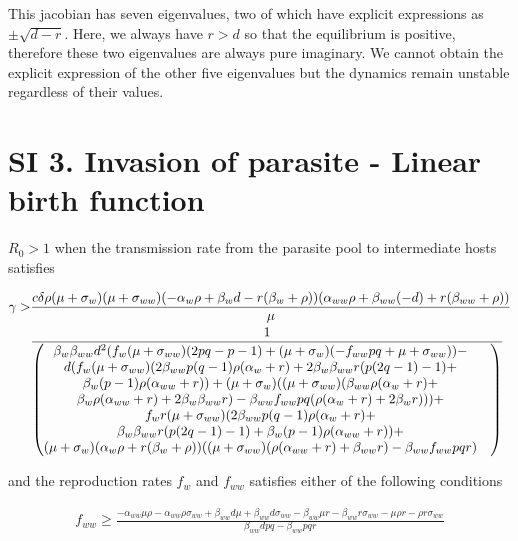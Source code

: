 \documentclass[11pt]{article}
\begin{document}
This jacobian has seven eigenvalues, two of which have explicit expressions as $\pm \sqrt{d - r}$. Here, we always have $r > d$ so that the equilibrium is positive, therefore these two eigenvalues are always pure imaginary. We cannot obtain the explicit expression of the other five eigenvalues but the dynamics remain unstable regardless of their values.

\section*{SI 3. Invasion of parasite - Linear birth function }


$R_0 > 1$ when the transmission rate from the parasite pool to intermediate hosts satisfies

\begin{align}
	\gamma > & \frac{c \delta  \rho  (\mu + \sigma_w) (\mu + \sigma_{ww}) (-\alpha_w \rho + \beta_w d-r (\beta_w+\rho )) (\alpha_{ww} \rho + \beta_{ww} (-d)+r (\beta_{ww}+\rho ))}{\mu } \notag \\
	& \frac{1}{\begin{pmatrix}
		\beta_w \beta_{ww} d^2 (f_w (\mu +\sigma_{ww}) (2 p q-p-1) + (\mu +\sigma_w) (-f_{ww} p q+\mu +\sigma_{ww})) - & \\
		 d (f_w (\mu +\sigma_{ww}) (2 \beta_{ww} p (q-1) \rho  (\alpha_w+r)+2 \beta_w \beta_{ww} r (p (2 q-1)-1)+ & \\
		 \beta_w (p-1) \rho  (\alpha_{ww}+r)) + (\mu +\sigma_w) ((\mu +\sigma_{ww}) (\beta_{ww} \rho  (\alpha_w+r) + & \\ 
		 \beta_w \rho  (\alpha_{ww}+r)+2 \beta_w \beta_{ww} r)-\beta_{ww} f_{ww} p q (\rho  (\alpha_w+r)+2 \beta_w r))) + & \\
		 f_w r (\mu +\sigma_{ww}) (2 \beta_{ww} p (q-1) \rho  (\alpha_w+r) +  & \\
		 \beta_w \beta_{ww} r (p (2 q-1)-1) + \beta_w (p-1) \rho  (\alpha_{ww}+r)) + & \\
		 (\mu +\sigma_w) (\alpha_w \rho +r (\beta_w+\rho )) ((\mu +\sigma_{ww}) (\rho  (\alpha_{ww}+r)+\beta_{ww} r)-\beta_{ww} f_{ww} p q r)
		\end{pmatrix}}
\end{align}

and the reproduction rates $f_w$ and $f_{ww}$ satisfies either of the following conditions

\begin{align}
f_{ww}\geq \frac{-\alpha_{ww} \mu  \rho -\alpha_{ww} \rho  \sigma_{ww} + \beta_{ww} d \mu +\beta_{ww} d \sigma_{ww}-\beta_{ww} \mu  r-\beta_{ww} r \sigma_{ww}-\mu  \rho  r-\rho  r \sigma_{ww}}{\beta_{ww} d p q-\beta_{ww} p q r}
\end{align}
\end{document}

